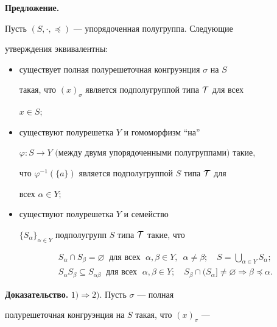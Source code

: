 {\bf Предложение.} {\it 


Пусть $(S,\cdot,\preceq)$ --- упорядоченная полугруппа. Следующие 


утверждения эквивалентны$:$ 


\begin{itemize} 


\item[1)] существует полная полурешеточная конгруэнция $\sigma$ на $S$ 


такая, что $(x)_\sigma$ является подполугруппой типа $\cal T$ для всех 


$x\in S;$ 


\item[2)] существуют полурешетка $Y$ и гомоморфизм ``на'' 


$\varphi:S\to Y$ $($между двумя упорядоченными полугруппами$)$ такие, 


что $\varphi^{-1}(\{a\})$ является подполугруппой $S$ типа $\cal T$ для 


всех $\alpha\in Y;$ 


\item[3)] существуют полурешетка $Y$ и семейство 


$\{S_\alpha\}_{\alpha\in Y}$ подполугрупп $S$ типа $\cal T$ такие, что 


\begin{gather*} 


S_\alpha\cap S_\beta=\varnothing\ \text{ для всех }\; 


\alpha,\beta\in Y,\ \; \alpha\ne\beta; \quad 


S=\bigcup_{\alpha\in Y}S_\alpha; \\ 


S_\alpha S_\beta\subseteq S_{\alpha\beta}\ \text{ для всех } 


\;\alpha,\beta\in Y;\quad 


S_\beta\cap(S_\alpha]\ne\varnothing\Rightarrow 


\beta\preceq\alpha. 


\end{gather*} 


\end{itemize} 


} 


 


{\bf Доказательство.} $1)\Rightarrow2)$. Пусть $\sigma$ --- полная 


полурешеточная конгруэнция на $S$ такая, что $(x)_\sigma$ --- 


